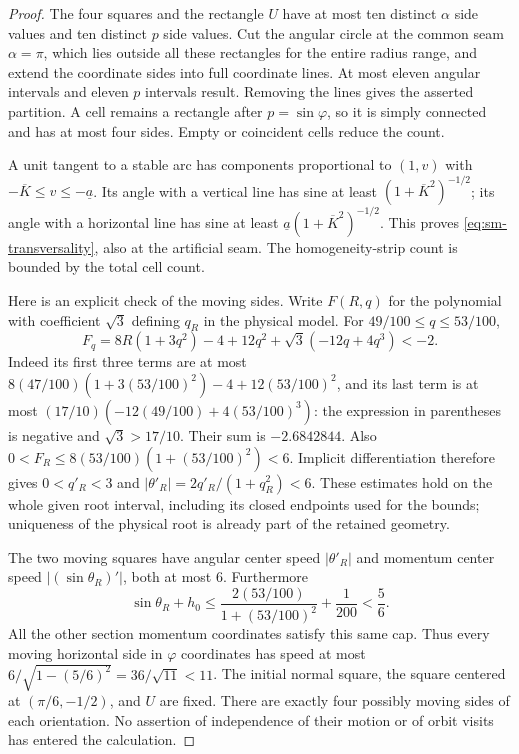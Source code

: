\begin{proof}
The four squares and the rectangle $U$ have at most ten distinct
$\alpha$ side values and ten distinct $p$ side values. Cut the
angular circle at the common seam $\alpha=\pi$, which lies outside
all these rectangles for the entire radius range, and extend the
coordinate sides into full coordinate lines. At most eleven angular
intervals and eleven $p$ intervals result. Removing the lines gives
the asserted partition. A cell remains a rectangle after
$p=\sin\varphi$, so it is simply connected and has at most four
sides. Empty or coincident cells reduce the count.

A unit tangent to a stable arc has components proportional to
$(1,v)$ with $-\overline K\le v\le-\underline a$. Its angle with
a vertical line has sine at least $(1+\overline K^2)^{-1/2}$;
its angle with a horizontal line has sine at least
$\underline a(1+\overline K^2)^{-1/2}$. This proves
\eqref{eq:sm-transversality}, also at the artificial seam. The
homogeneity-strip count is bounded by the total cell count.

Here is an explicit check of the moving sides. Write $F(R,q)$ for
the polynomial with coefficient $\sqrt3$ defining $q_R$ in the
physical model. For $49/100\le q\le53/100$,
\[
 F_q=8R(1+3q^2)-4+12q^2+\sqrt3(-12q+4q^3)<-2.
\]
Indeed its first three terms are at most
$8(47/100)(1+3(53/100)^2)-4+12(53/100)^2$, and its last term
is at most $(17/10)(-12(49/100)+4(53/100)^3)$: the expression
in parentheses is negative and $\sqrt3>17/10$. Their sum is
$-2.6842844$. Also $0<F_R\le8(53/100)(1+(53/100)^2)<6$.
Implicit differentiation therefore gives $0<q'_R<3$ and
$|\theta'_R|=2q'_R/(1+q_R^2)<6$. These estimates hold on the
whole given root interval, including its closed endpoints used for
the bounds; uniqueness of the physical root is already part of
the retained geometry.

The two moving squares have angular center speed $|\theta'_R|$
and momentum center speed $|(\sin\theta_R)'|$, both at most $6$.
Furthermore
\[
 \sin\theta_R+h_0\le
 \frac{2(53/100)}{1+(53/100)^2}+\frac1{200}<\frac56.
\]
All the other section momentum coordinates satisfy this same cap.
Thus every moving horizontal side in $\varphi$ coordinates has
speed at most $6/\sqrt{1-(5/6)^2}=36/\sqrt{11}<11$.
The initial normal square, the square centered at $(\pi/6,-1/2)$,
and $U$ are fixed. There are exactly four possibly moving sides
of each orientation. No assertion of independence of their motion
or of orbit visits has entered the calculation.
\end{proof}

